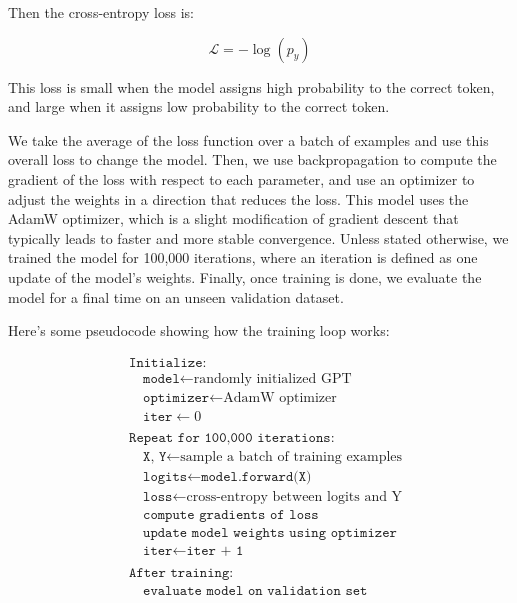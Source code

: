 \documentclass[11pt]{article}
\begin{document}
Then the cross-entropy loss is:

\[
\mathcal{L} = -\log(p_y)
\]

This loss is small when the model assigns high probability to the
correct token, and large when it assigns low probability to the correct
token.

We take the average of the loss function over a batch of examples and
use this overall loss to change the model. Then, we use backpropagation
to compute the gradient of the loss with respect to each parameter, and
use an optimizer to adjust the weights in a direction that reduces the
loss. This model uses the AdamW optimizer, which is a slight
modification of gradient descent that typically leads to faster and more
stable convergence. Unless stated otherwise, we trained the model for
100,000 iterations, where an iteration is defined as one update of the
model's weights. Finally, once training is done, we evaluate the model
for a final time on an unseen validation dataset.

Here's some pseudocode showing how the training loop works:

\begin{equation*}
\begin{aligned}
&\texttt{Initialize:} \\
&\quad \texttt{model} \leftarrow \text{randomly initialized GPT} \\
&\quad \texttt{optimizer} \leftarrow \text{AdamW optimizer} \\
&\quad \texttt{iter} \leftarrow 0 \\
\\
&\texttt{Repeat for 100,000 iterations:} \\
&\quad \texttt{X, Y} \leftarrow \text{sample a batch of training examples} \\
&\quad \texttt{logits} \leftarrow \texttt{model.forward(X)} \\
&\quad \texttt{loss} \leftarrow \text{cross-entropy between logits and Y} \\
&\quad \texttt{compute gradients of loss} \\
&\quad \texttt{update model weights using optimizer} \\
&\quad \texttt{iter} \leftarrow \texttt{iter + 1} \\
\\
&\texttt{After training:} \\
&\quad \texttt{evaluate model on validation set}
\end{aligned}
\end{equation*}
\end{document}
